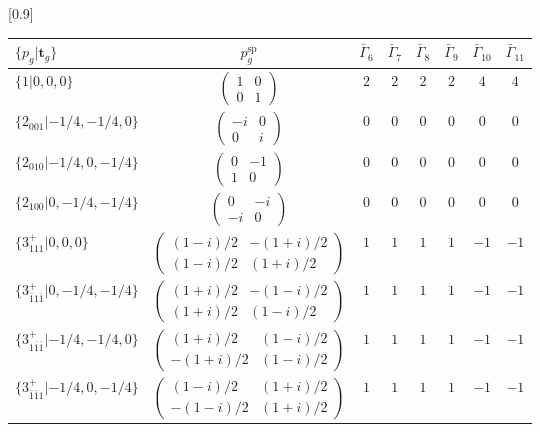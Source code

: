 \documentclass[3p,preprint]{elsarticle}
\newcommand{\bt}{\bm{t}}
\begin{document}
\begin{table}[H]
	\scalebox{0.9}[0.9]{
		\begin{tabular}{|l|c||c|c|c|c|c|c|} \hline
			$\{p_g|\bt_g\}$ & $p_g^{\text{sp}}$ & $\bar{\Gamma}_6$ & $\bar{\Gamma}_7$ & $\bar{\Gamma}_8$ & $\bar{\Gamma}_9$ & $\bar{\Gamma}_{10}$ & $\bar{\Gamma}_{11}$  \\ \hline \hline
			$\{1|0,0,0\}$ & 				$\left(\begin{array}{cc} 1&0 \\ 0&1 \end{array}\right)$	& $2$ &  $2$ &  $2$ &  $2$ &  $4$ &  $4$ \\ \hline
			$\{2_{001}|-1/4,-1/4,0\}$ &		$\left(\begin{array}{cc} -i&0 \\ 0&i \end{array}\right)$	& $0$ & $0$ & $0$ & $0$ & $0$ & $0$ \\ \hline
			$\{2_{010}|-1/4,0,-1/4\}$ &		$\left(\begin{array}{cc} 0&-1 \\ 1&0 \end{array}\right)$	&$0$ & $0$ & $0$ & $0$ & $0$ & $0$ \\ \hline
			$\{2_{100}|0,-1/4,-1/4\}$ &		$\left(\begin{array}{cc} 0&-i \\ -i&0 \end{array}\right)$	& $0$ & $0$ & $0$ & $0$ & $0$ & $0$ \\ \hline
			$\{3^{+}_{111}|0,0,0\}$ &		$\left(\begin{array}{cc} (1-i)/2&-(1+i)/2 \\ (1-i)/2&(1+i)/2 \end{array}\right)$	&$1$ & $1$ & $1$ & $1$ & $-1$ & $-1$ \\ \hline
			$\{3^{+}_{\bar{1}1\bar{1}}|0,-1/4,-1/4\}$ &		$\left(\begin{array}{cc} (1+i)/2&-(1-i)/2 \\ (1+i)/2&(1-i)/2 \end{array}\right)$	&$1$ & $1$ & $1$ & $1$ & $-1$ & $-1$ \\ \hline
			$\{3^{+}_{1\bar{1}\bar{1}}|-1/4,-1/4,0\}$ &		$\left(\begin{array}{cc} (1+i)/2&(1-i)/2 \\ -(1+i)/2&(1-i)/2 \end{array}\right)$	& $1$ & $1$ & $1$ & $1$ & $-1$ & $-1$ \\ \hline
			$\{3^{+}_{\bar{1}\bar{1}1}|-1/4,0,-1/4\}$ &		$\left(\begin{array}{cc} (1-i)/2&(1+i)/2 \\ -(1-i)/2&(1+i)/2 \end{array}\right)$	&$1$ & $1$ & $1$ & $1$ & $-1$ & $-1$ \\ \hline

\end{tabular}}
\end{table}
\end{document}
